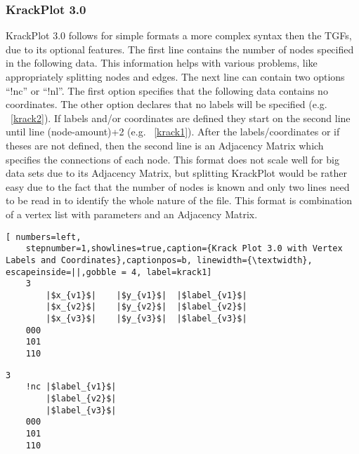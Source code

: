 \subsubsection{KrackPlot 3.0}
KrackPlot 3.0 follows for simple formats a more complex syntax then the TGFs, due to its optional features. The first line contains the number of nodes specified in the following data. This information helps with various problems, like appropriately splitting nodes  and edges. The next line can contain two options “!nc” or “!nl”. The first option specifies that the following data contains no coordinates. The other option declares that no labels will be specified (e.g. ~\ref{krack2}). If labels and/or coordinates are defined they start on the second line until line (node-amount)+2 (e.g. ~\ref{krack1}). After the labels/coordinates or if theses are not defined, then the second line is an Adjacency Matrix which specifies the connections of each node.
This format does not scale well for big data sets due to its Adjacency Matrix, but splitting KrackPlot would be rather easy due to the fact that the number of nodes is known and only two lines need to be read in to identify the whole nature of the file. This format is combination of a vertex list with parameters and an Adjacency Matrix. \cite{D.KrackhardtJ.BlytheC.McGrath.4.12.2001}\\
\noindent\begin{minipage}{.48\textwidth}
	\begin{lstlisting}[ numbers=left,
	stepnumber=1,showlines=true,caption={Krack Plot 3.0 with Vertex Labels and Coordinates},captionpos=b, linewidth={\textwidth}, escapeinside=||,gobble = 4, label=krack1]
	3
		|$x_{v1}$|    |$y_{v1}$|  |$label_{v1}$|  
		|$x_{v2}$|    |$y_{v2}$|  |$label_{v2}$|   
		|$x_{v3}$|    |$y_{v3}$|  |$label_{v3}$|  
	000
	101
	110
	\end{lstlisting}
\end{minipage}\hfill
\begin{minipage}{.48\textwidth}
	\begin{lstlisting}[numbers=none,caption={Krack Plot 3.0 with Vertex Labels},captionpos=b, linewidth={\textwidth}, escapeinside=||,gobble = 4,label=krack2]
	3
	!nc	|$label_{v1}$|  
		|$label_{v2}$|   
		|$label_{v3}$| 
	000
	101
	110
	\end{lstlisting}
\end{minipage}

